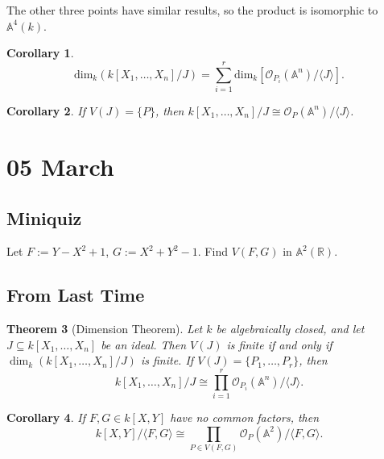 \documentclass[12pt]{article}
\newcommand{\real}{\mathbb{R}}
\newcommand{\vbrack}[1]{\langle #1\rangle}
\newtheorem{theorem}{Theorem}[section]
\newtheorem{corollary}[theorem]{Corollary}
\theoremstyle{definition}
\begin{document}
The other three points have similar results, so the product is isomorphic to $\mathbb{A}^4(k)$.
\begin{corollary}
    \[\mathrm{dim}_k(k[X_1,\dotsc,X_n]/J)=\sum\limits_{i=1}^r\mathrm{dim}_k[\mathcal{O}_{P_i}(\mathbb{A}^n)/\vbrack{J}].\]
\end{corollary}
\begin{corollary}
    If $V(J)=\{P\}$, then $k[X_1,\dotsc,X_n]/J\cong\mathcal{O}_P(\mathbb{A}^n)/\vbrack{J}$.
\end{corollary}
\section{05 March}
\subsection{Miniquiz}
Let $F:=Y-X^2+1$, $G:=X^2+Y^2-1$. Find $V(F,G)$ in $\mathbb{A}^2(\real)$.
\subsection{From Last Time}
\begin{theorem}[Dimension Theorem]
    Let $k$ be algebraically closed, and let $J\subseteq k[X_1,\dotsc,X_n]$ be an ideal. Then $V(J)$ is finite if and only if $\dim_k(k[X_1,\dotsc,X_n]/J)$ is finite. If $V(J)=\{P_1,\dotsc,P_r\}$, then
    \begin{equation}
        k[X_1,\dotsc,X_n]/J\cong\prod\limits_{i=1}^r\mathcal{O}_{P_i}(\mathbb{A}^n)/\vbrack{J}.
    \end{equation}
\end{theorem}
\begin{corollary}
    If $F,G\in k[X,Y]$ have no common factors, then
    \begin{equation}
        k[X,Y]/\vbrack{F,G}\cong\prod\limits_{P\in V(F,G)}\mathcal{O}_P(\mathbb{A}^2)/\vbrack{F,G}.
    \end{equation}
\end{corollary}
\end{document}
